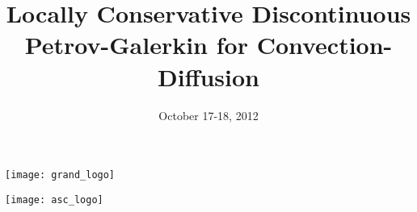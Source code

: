 \documentclass[mathserif]{beamer}
\date{October 17-18, 2012}
\institute{The University of Texas at Austin}
\title[Locally Conservative DPG]{Locally Conservative Discontinuous 
Petrov-Galerkin for Convection-Diffusion}
\begin{document}
\begin{frame}
\begin{center}
\texttt{[image: grand\_logo]}\\
\end{center}
\titlepage
\begin{flushright}
\texttt{[image: asc\_logo]}\\
\end{flushright}
\end{frame}
\begin{comment}
My name is Truman Ellis, and I am also working in Dr. Demkowicz's group on the
discontinuous Petrov-Galerkin method. My background is in aerospace
engineering and CFD, and my goal is to help develop DPG into an attractive
method for realistic problems in computational fluid dynamics. So the goal is
to work on the Euler equations and then build on Nate and Jesse's work on
laminar Navier-Stokes with some turbulence modeling.  But before I got into
that, we thought it would be useful to study a topic that keeps coming up from
the CFD community. Is DPG locally conservative?

This is a numerical characteristic close to the heart of many CFD
practitioners, and in order for DPG to gain a certain level of acceptance
among these circles, we need to address some of these concerns. There are also
some mathematically attractive reasons to pursue local conservation. The
Lax-Wendroff theorem guarantees that a convergent numerical solution to a
system of hyperbolic conservation laws will converge to the correct weak
solution. Also, we are focusing on local conservation on the
convection-diffusion equation as a proof of concept. We are working on
extending this work to more realistic flow simulations.
\end{comment}
\end{document}
